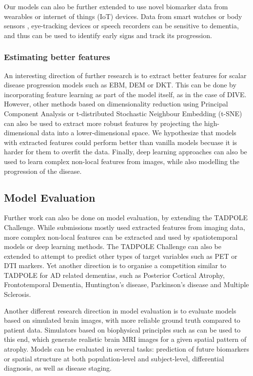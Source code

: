 Our models can also be further extended to use novel biomarker data from wearables or internet of things (IoT) devices. Data from smart watches or body sensors \cite{hsu2014gait}, eye-tracking devices \cite{hutton1984eye} or speech recorders \cite{hoffmann2010temporal} can be sensitive to dementia, and thus can be used to identify early signs and track its progression. 

\subsubsection{Estimating better features}
\label{sec:conMetFea}

An interesting direction of further research is to extract better features for scalar disease progression models such as EBM, DEM or DKT. This can be done by incorporating feature learning as part of the model itself, as in the case of DIVE. However, other methods based on dimensionality reduction using Principal Component Analysis or t-distributed Stochastic Neighbour Embedding (t-SNE) \cite{hinton2003stochastic} can also be used to extract more robust features by projecting the high-dimensional data into a lower-dimensional space. We hypothesize that  models with extracted features could perform better than vanilla models becuase it is harder for them to overfit the data. Finally, deep learning approaches can also be used to learn complex non-local features from images, while also modelling the progression of the disease.

\subsection{Model Evaluation}
\label{sec:conEva}

Further work can also be done on model evaluation, by extending the TADPOLE Challenge. While submissions mostly used extracted features from imaging data, more complex non-local features can be extracted and used by spatiotemporal models or deep learning methods. The TADPOLE Challenge can also be extended to attempt to predict other types of target variables such as PET or DTI markers. Yet another direction is to organise a competition similar to TADPOLE for AD related dementias, such as Posterior Cortical Atrophy, Frontotemporal Dementia, Huntington's disease, Parkinson's disease and Multiple Sclerosis.

Another different research direction in model evaluation is to evaluate models based on simulated brain images, with more reliable ground truth compared to patient data. Simulators based on biophysical principles such as \cite{khanal2016biophysical} can be used to this end, which generate realistic brain MRI images for a given spatial pattern of atrophy. Models can be evaluated in several tasks: prediction of future biomarkers or spatial structure at both population-level and subject-level, differential diagnosis, as well as disease staging. 
% 

